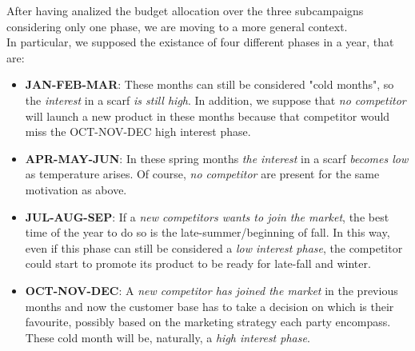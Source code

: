 After having analized the budget allocation over the three subcampaigns considering only one phase, we are moving to a more general context.
\\In particular, we supposed the existance of four different phases in a year, that are:
\begin{itemize}
	\item \textbf{JAN-FEB-MAR}: These months can still be considered "cold months", so the \emph{interest} in a scarf \emph{is still high}. In addition, we suppose that \emph{no competitor} will launch a new product in these months because that competitor would miss the OCT-NOV-DEC high interest phase.
	\item \textbf{APR-MAY-JUN}: In these spring months \emph{the interest} in a scarf \emph{becomes low} as temperature arises. Of course, \emph{no competitor} are present for the same motivation as above.
	\item \textbf{JUL-AUG-SEP}: If a \emph{new competitors wants to join the market}, the best time of the year to do so is the late-summer/beginning of fall. In this way, even if this phase can still be considered a \emph{low interest phase}, the competitor could start to promote its product to be ready for late-fall and winter.
	\item \textbf{OCT-NOV-DEC}: A \emph{new competitor has joined the market} in the previous months and now the customer base has to take a decision on which is their favourite, possibly based on the marketing strategy each party encompass. These cold month will be, naturally, a \emph{high interest phase}.
\end{itemize}